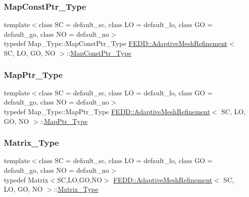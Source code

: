 \subsubsection{\texorpdfstring{Map\+Const\+Ptr\+\_\+\+Type}{MapConstPtr\_Type}}
{\footnotesize\ttfamily template$<$class SC  = default\+\_\+sc, class LO  = default\+\_\+lo, class GO  = default\+\_\+go, class NO  = default\+\_\+no$>$ \\
typedef Map\+\_\+\+Type\+::\+Map\+Const\+Ptr\+\_\+\+Type \hyperlink{classFEDD_1_1AdaptiveMeshRefinement}{F\+E\+D\+D\+::\+Adaptive\+Mesh\+Refinement}$<$ SC, LO, GO, NO $>$\+::\hyperlink{classFEDD_1_1AdaptiveMeshRefinement_a584bfb3398e9072ddf188bfa3c04c926}{Map\+Const\+Ptr\+\_\+\+Type}}

\mbox{\label{classFEDD_1_1AdaptiveMeshRefinement_a751bcbe2e4fddcdcde836067b776d42d}} 
\subsubsection{\texorpdfstring{Map\+Ptr\+\_\+\+Type}{MapPtr\_Type}}
{\footnotesize\ttfamily template$<$class SC  = default\+\_\+sc, class LO  = default\+\_\+lo, class GO  = default\+\_\+go, class NO  = default\+\_\+no$>$ \\
typedef Map\+\_\+\+Type\+::\+Map\+Ptr\+\_\+\+Type \hyperlink{classFEDD_1_1AdaptiveMeshRefinement}{F\+E\+D\+D\+::\+Adaptive\+Mesh\+Refinement}$<$ SC, LO, GO, NO $>$\+::\hyperlink{classFEDD_1_1AdaptiveMeshRefinement_a751bcbe2e4fddcdcde836067b776d42d}{Map\+Ptr\+\_\+\+Type}}

\mbox{\label{classFEDD_1_1AdaptiveMeshRefinement_a607791df1d84bc4ea9fc08acd31225c7}} 
\subsubsection{\texorpdfstring{Matrix\+\_\+\+Type}{Matrix\_Type}}
{\footnotesize\ttfamily template$<$class SC  = default\+\_\+sc, class LO  = default\+\_\+lo, class GO  = default\+\_\+go, class NO  = default\+\_\+no$>$ \\
typedef Matrix$<$SC,LO,GO,NO$>$ \hyperlink{classFEDD_1_1AdaptiveMeshRefinement}{F\+E\+D\+D\+::\+Adaptive\+Mesh\+Refinement}$<$ SC, LO, GO, NO $>$\+::\hyperlink{classFEDD_1_1AdaptiveMeshRefinement_a607791df1d84bc4ea9fc08acd31225c7}{Matrix\+\_\+\+Type}}

